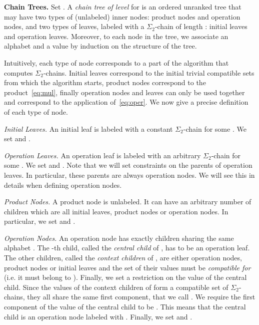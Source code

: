 \documentclass[envcountsame]{llncs}
\newcommand{\sic}[1]{\ensuremath{\Sigma_{#1}}\xspace}
\newcommand\chain{chain\xspace}
\newcommand\qchain[1]{\ensuremath{\sic{#1}}-chain\xspace}
\newcommand\qchains[1]{\ensuremath{\sic{#1}}-chains\xspace}
\newcommand\Chain{Chain\xspace}
\newcommand\dchain{\qchain{2}}
\newcommand\dchains{\qchains{2}}
\begin{document}
\medskip
\noindent
{\bf \Chain Trees.} Set . A \emph{\chain tree}  \emph{of
  level}  for  is an ordered unranked tree that may have
two types of (unlabeled) inner nodes: product nodes and operation
nodes, and two types of leaves, labeled with a \dchain of length :
initial leaves and operation leaves. Moreover, to each node  in
the tree, we associate an alphabet  and a
value  by induction on the structure of the tree.

Intuitively, each type of node corresponds to a part of the algorithm that
computes \dchains. Initial leaves correspond to the initial trivial compatible
sets from which the algorithm starts, product nodes correspond to the product~\eqref{eq:mul},
finally operation nodes and leaves can only be used together and correspond to
the application of~\eqref{eq:oper}. We now give a precise definition of each
type of node.

\medskip
\noindent
{\it Initial Leaves.} An initial leaf  is labeled  with a constant
\dchain  for some .
We set  and .

\medskip
\noindent
{\it Operation Leaves.} An operation leaf  is labeled with an arbitrary
\dchain  for some .
We set  and . Note that we
will set constraints on the parents of operation leaves. In
particular, these parents are always operation nodes. We will see
this in details when defining operation nodes.


\medskip
\noindent
{\it Product Nodes.} A product node  is unlabeled. It can have an
arbitrary number of children  which are all initial
leaves, product nodes or operation nodes. In particular, we set
 and
.

\medskip
\noindent
{\it Operation Nodes.} An operation node  has exactly  children sharing the same alphabet . The -th
child, called the \emph{central child} of , has to be an operation 
leaf. The other children, called the \emph{context children} of ,
are either operation nodes, product nodes or initial leaves and the
set of their values must be \emph{compatible for } (i.e. it
must belong to ). Finally, we set a restriction on
the value of the central child. Since the values of the context
children of  form a compatible set of \dchains, they all share the
same first component, that we call . We require the first component
of the value of the central child to be . This means that
the central child is an operation node labeled with
. Finally, we
set  and .
\end{document}
